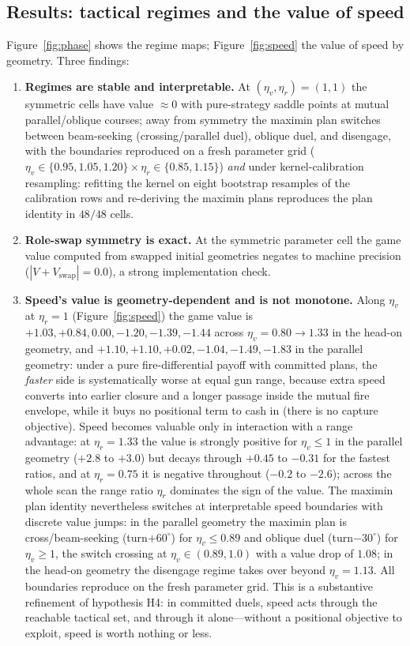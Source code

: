 \documentclass[12pt,a4paper]{article}
\newcommand{\etav}{\eta_v}
\newcommand{\etar}{\eta_r}
\begin{document}
\subsection{Results: tactical regimes and the value of speed}
Figure~\ref{fig:phase} shows the regime maps; Figure~\ref{fig:speed} the
value of speed by geometry.  Three findings:
\begin{enumerate}
\item \textbf{Regimes are stable and interpretable.}  At
$(\etav,\etar)=(1,1)$ the symmetric cells have value $\approx0$ with
pure-strategy saddle points at mutual parallel/oblique courses; away from
symmetry the maximin plan switches between beam-seeking (crossing/parallel
duel), oblique duel, and disengage, with the boundaries reproduced on a
fresh parameter grid ($\etav\in\{0.95,1.05,1.20\}\times
\etar\in\{0.85,1.15\}$) \emph{and} under kernel-calibration
resampling: refitting the kernel on eight bootstrap resamples of the
calibration rows and re-deriving the maximin plans reproduces the plan
identity in $48/48$ cells.
\item \textbf{Role-swap symmetry is exact.}  At the symmetric parameter
cell the game value computed from swapped initial geometries negates to
machine precision ($|V+V_{\text{swap}}|=0.0$), a strong implementation
check.
\item \textbf{Speed's value is geometry-dependent and is not monotone.}
Along $\etav$ at $\etar=1$ (Figure~\ref{fig:speed}) the game value is
$+1.03, +0.84, 0.00, -1.20, -1.39, -1.44$ across
$\etav=0.80\to1.33$ in the head-on geometry, and
$+1.10, +1.10, +0.02, -1.04, -1.49, -1.83$ in the parallel geometry:
under a pure fire-differential payoff with committed plans, the
\emph{faster} side is systematically worse at equal gun range, because
extra speed converts into earlier closure and a longer passage inside the
mutual fire envelope, while it buys no positional term to cash in
(there is no capture objective).  Speed becomes valuable only in
interaction with a range advantage: at $\etar=1.33$ the value is strongly
positive for $\etav\le1$ in the parallel geometry ($+2.8$ to $+3.0$) but
decays through $+0.45$ to $-0.31$ for the fastest ratios, and at
$\etar=0.75$ it is negative throughout ($-0.2$ to $-2.6$); across the
whole scan the range ratio $\etar$ dominates the sign of the value.  The maximin plan identity nevertheless switches at
interpretable speed boundaries with discrete value jumps: in the parallel
geometry the maximin plan is cross/beam-seeking (turn$+60^\circ$) for
$\etav\le0.89$ and oblique duel (turn$-30^\circ$) for $\etav\ge1$,
the switch crossing at $\etav\in(0.89,1.0)$ with a value drop of
$1.08$; in the head-on geometry the disengage regime takes over beyond
$\etav=1.13$.  All boundaries reproduce on the fresh parameter grid.  This is a
substantive refinement of hypothesis H4: in committed duels, speed acts
through the reachable tactical set, and through it alone---without a
positional objective to exploit, speed is worth nothing or less.
\end{enumerate}
\end{document}
